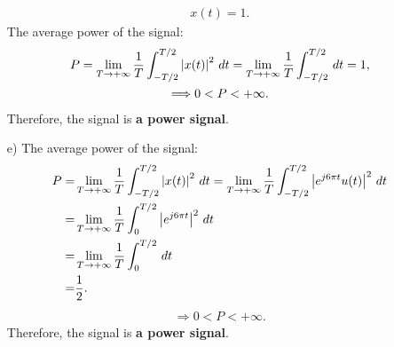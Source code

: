 \documentclass{assignment}
\begin{document}
\begin{sol}
\begin{itemize}
        \begin{align}
            x(t)=1.
        \end{align}
        The average power of the signal:
        \begin{gather}
            P=\lim_{T\rightarrow+\infty}\frac{1}{T}\int_{-T/2}^{T/2}\left\lvert x(t)\right\rvert^2\,dt=\lim_{T\rightarrow+\infty}\frac{1}{T}\int_{-T/2}^{T/2}\,dt=1,\\
            \Longrightarrow 0<P<+\infty.
        \end{gather}
        Therefore, the signal is \textbf{a power signal}.
        \item[e)] The average power of the signal:
        \begin{align}
            \notag P=&\lim_{T\rightarrow+\infty}\frac{1}{T}\int_{-T/2}^{T/2}\left\lvert x(t)\right\rvert^2\,dt=\lim_{T\rightarrow+\infty}\frac{1}{T}\int_{-T/2}^{T/2}\left\lvert e^{j6\pi t}u(t)\right\rvert^2\,dt\\
            \notag=&\lim_{T\rightarrow+\infty}\frac{1}{T}\int_0^{T/2}\left\lvert e^{j6\pi t}\right\rvert^2\,dt\\
            \notag=&\lim_{T\rightarrow+\infty}\frac{1}{T}\int_0^{T/2}\,dt\\
            =&\frac{1}{2}.
        \end{align}
        \begin{align}
            \Longrightarrow 0<P<+\infty.
        \end{align}
        Therefore, the signal is \textbf{a power signal}.
    \end{itemize}
\end{sol}
\end{document}

